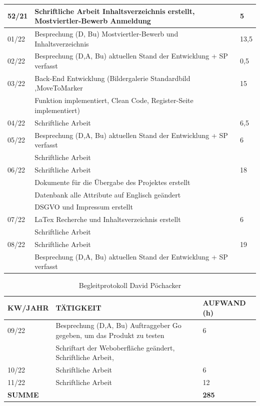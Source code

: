 \begin{table}[h]
\begin{tabular}{|l|l|l|}
52/21   & Schriftliche Arbeit Inhaltsverzeichnis erstellt, Mostviertler-Bewerb Anmeldung& 5 \\ \hline			
01/22   & Besprechung (D, Bu) Mostviertler-Bewerb und Inhaltsverzeichnis & 13,5 \\ \hline		
02/22   & Besprechung (D,A, Bu) aktuellen Stand der Entwicklung + SP verfasst & 0,5 \\ \hline	
03/22   & Back-End Entwicklung (Bildergalerie Standardbild ,MoveToMarker  & 15 \\ 
& Funktion implementiert, Clean Code, Register-Seite implementiert) & \\ \hline	
04/22   & Schriftliche Arbeit & 6,5 \\ \hline		
05/22   & Besprechung (D,A, Bu) aktuellen Stand der Entwicklung + SP verfasst  & 6 \\ 
& Schriftliche Arbeit & \\ \hline		
06/22   & Schriftliche Arbeit & 18 \\
& Dokumente für die Übergabe des Projektes erstellt &  \\ 
& Datenbank alle Attribute auf Englisch geändert  & \\ 
& DSGVO und Impressum erstellt  & \\ \hline	
07/22   & LaTex Recherche und Inhaltsverzeichnis erstellt  & 6 \\ 
& Schriftliche Arbeit & \\ \hline	
08/22   & Schriftliche Arbeit  & 19 \\ 
& Besprechung (D,A, Bu) aktuellen Stand der Entwicklung + SP verfasst  & \\ \hline
		
	\end{tabular}
\end{table}

\newpage
\begin{table}[h]
	\begin{tabular}{|l|l|l|}
		\hline
		\textbf{KW/JAHR} &     \textbf{TÄTIGKEIT}  & 	\textbf{AUFWAND (h)}    \\ \hline
		
09/22   & Besprechung (D,A, Bu) Auftraggeber Go gegeben, um das Produkt zu testen   & 6 \\ 
		& Schriftart der Weboberfläche geändert, Schriftliche Arbeit, & \\ \hline		
10/22   & Schriftliche Arbeit & 6 \\ \hline
11/22   & Schriftliche Arbeit & 12 \\ \hline	
		
\textbf{SUMME} & & \textbf{285}\\ \hline

	\end{tabular}
	\caption{Begleitprotokoll David Pöchacker}
	\label{tab:Begleitprotokoll David Pöchacker}
\end{table}








